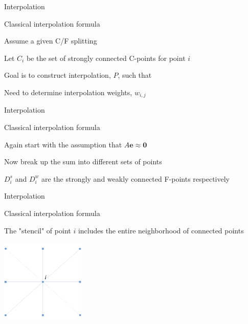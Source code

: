 \documentclass[18pt,xcolor=table]{beamer}
\begin{document}
\begin{frame}{Interpolation}
\begin{block}{Classical interpolation formula}
\bit
\item Assume a given C/F splitting
\item Let $C_i$ be the set of strongly connected C-points for point $i$
\item Goal is to construct interpolation, $P$, such that
\item Need to determine interpolation weights, $w_{i,j}$
\eit
\end{block}
\end{frame}

\begin{frame}{Interpolation}
\begin{block}{Classical interpolation formula}
\bit
\item Again start with the assumption that $A\mathbf{e} \approx \mathbf{0}$
\item Now break up the sum into different sets of points
\item $D^s_i$ and $D^w_i$ are the strongly and weakly connected F-points respectively
\eit
\end{block}
\end{frame}


\begin{frame}{Interpolation}
\begin{block}{Classical interpolation formula}
\bit
\item The "stencil" of point $i$ includes the entire neighborhood of connected points
\eit
\end{block}
\begin{center}
\includegraphics[width=0.3\textwidth]{../figures/interpStencil}
\end{center}
\end{frame}
\end{document}
